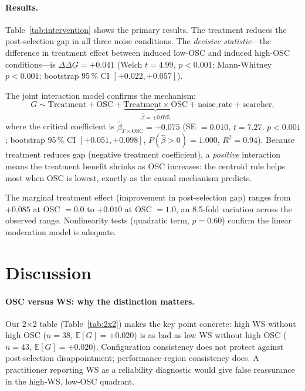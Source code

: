 \documentclass[twoside]{article}
\newcommand{\OSC}{\mathrm{OSC}}
\newcommand{\bE}{\mathbb{E}}
\begin{document}
\paragraph{Results.}
Table~\ref{tab:intervention} shows the primary results. The treatment
reduces the post-selection gap in all three noise conditions. The
\emph{decisive statistic}---the difference in treatment effect between
induced low-OSC and induced high-OSC conditions---is
$\Delta\Delta G = +0.041$ (Welch $t = 4.99$, $p < 0.001$; Mann-Whitney
$p < 0.001$; bootstrap 95\,\% CI $[+0.022, +0.057]$).

The joint interaction model confirms the mechanism:
\begin{equation}
  G \sim \mathrm{Treatment} + \OSC +
    \underbrace{\mathrm{Treatment} \times \OSC}_{\hat\beta = +0.075}
    + \mathrm{noise\_rate} + \mathrm{searcher},
\end{equation}
where the critical coefficient is $\hat\beta_{T \times \mathrm{OSC}} =
+0.075$ (SE $= 0.010$, $t = 7.27$, $p < 0.001$; bootstrap 95\,\% CI
$[+0.051, +0.098]$, $P(\hat\beta > 0) = 1.000$, $R^2 = 0.94$). Because
treatment reduces gap (negative treatment coefficient), a \emph{positive}
interaction means the treatment benefit shrinks as OSC increases: the
centroid rule helps most when OSC is lowest, exactly as the causal
mechanism predicts.

The marginal treatment effect (improvement in post-selection gap) ranges
from $+0.085$ at OSC $= 0.0$ to $+0.010$ at OSC $= 1.0$, an 8.5-fold
variation across the observed range. Nonlinearity tests (quadratic term,
$p = 0.60$) confirm the linear moderation model is adequate.

\section{Discussion}
\label{sec:discussion}

\paragraph{OSC versus WS: why the distinction matters.}
Our 2$\times$2 table (Table~\ref{tab:2x2}) makes the key point concrete:
high WS without high OSC ($n=38$, $\bE[G] = +0.020$) is as bad as low
WS without high OSC ($n=43$, $\bE[G] = +0.020$). Configuration
consistency does not protect against post-selection disappointment;
performance-region consistency does. A practitioner reporting WS as a
reliability diagnostic would give false reassurance in the high-WS,
low-OSC quadrant.
\end{document}
